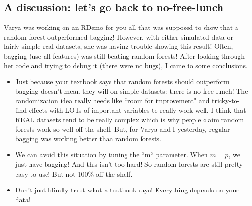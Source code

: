 \subsection{A discussion: let's go back to no-free-lunch}

Varya was working on an RDemo for you all that was supposed to show that a random forest outperformed bagging! However, with either simulated data or fairly simple real datasets, she was having trouble showing this result! Often, bagging (use all features) was still beating random forests! After looking through her code and trying to debug it (there were no bugs), I came to some conclusions. 

\begin{itemize}
\item Just because your textbook says that random forests should outperform bagging doesn't mean they will on simple datasets: there is no free lunch! The randomization idea really needs like ``room for improvement" and tricky-to-find effects with LOTs of important variables to really work well. I think that REAL datasets tend to be really complex which is why people claim random forests work so well off the shelf. But, for Varya and I yesterday, regular bagging was working better than random forests. 
\item We can avoid this situation by tuning the ``m`` parameter. When $m=p$, we just have bagging! And this isn't too hard! So random forests are still pretty easy to use! But not 100\% off the shelf.
\item Don't just blindly trust what a textbook says! Everything depends on your data!
\end{itemize}





